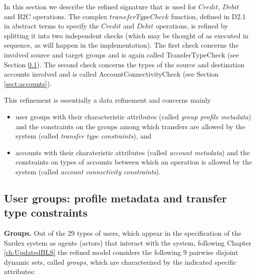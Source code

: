 In this section we describe the refined signature that is used for $Credit$, $Debit$ and B2C operations. The complex $transferTypeCheck$ function, defined in D2.1 in abstract terms to specify the $Credit$ and $Debit$ operations, is refined by splitting it into two independent checks (which may be thought of as executed in sequence, as will happen in the implementation).  The first check concerns the involved source and target groups and is again called TransferTypeCheck (see Section \ref{sect:usergroups}). The second check concerns the types of the source and destination accounts involved and is called AccountConnectivityCheck (see Section \ref{sect:accounts}).

This refinement is essentially a data refinement and concerns mainly 
\begin{itemize}
	\item user groups with their characteristic attributes (called \emph{group profile metadata}) and the constraints on the groups among which transfers are allowed by the system (called \emph{transfer type constraints}), and
	\item accounts with their charateristic attributes (called \emph{account metadata}) and the constraints on types of accounts between which an operation is allowed by the system (called \emph{account connectivity constraints}).
\end{itemize}

\subsection{User groups: profile metadata and transfer type constraints}
\label{sect:usergroups} 

{\bf Groups.} Out of the 29 types of users, which appear in the specification of the Sardex system as agents (actors) that interact with the system, following Chapter \ref{ch:UpdatedBLS} the refined model considers the following 9 pairwise disjoint dynamic sets, called \emph{groups}, which are characterized by the indicated specific attributes:

